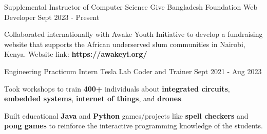 

\begin{cventries}

\cventryalt
    {Supplemental Instructor of Computer Science} %
    {Give Bangladesh Foundation} %
    {Web Developer} %
    {Sept 2023 - Present} %
    {
      \begin{cvitems}
      \item {Collaborated internationally with Awake Youth Initiative to develop a fundraising website that supports the African underserved slum communities in Nairobi, Kenya. Website link: \textbf{https://awakeyi.org/}}
      \end{cvitems}
    }

\cventryalt
    {Engineering Practicum Intern} %
    {Tesla Lab} %
    {Coder and Trainer} %
    {Sept 2021 - Aug 2023} %
    {
      \begin{cvitems}
      \item {Took workshops to train \textbf{400+} individuals about \textbf{integrated circuits}, \textbf{embedded systems}, \textbf{internet of things}, and \textbf{drones}.}
      \item {Built educational \textbf{Java} and \textbf{Python} games/projects like \textbf{spell checkers} and \textbf{pong games} to reinforce the interactive programming knowledge of the students.}
      \end{cvitems}
    }

\end{cventries}
